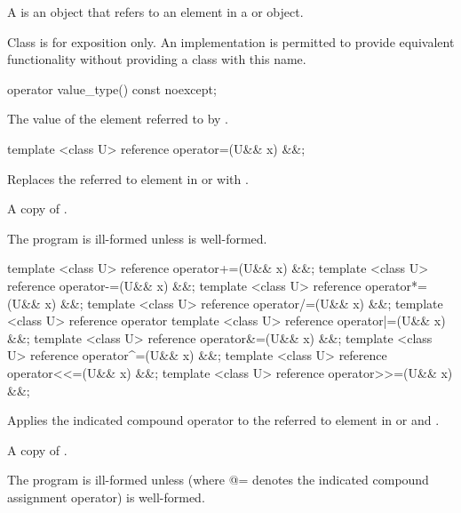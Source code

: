 \label{sec:reference type}
\pnum A  is an object that refers to an element in a \simd or \mask object.

\pnum Class  is for exposition only.
An implementation is permitted to provide equivalent functionality without providing a class with this name.



\begin{itemdecl}
operator value_type() const noexcept;
\end{itemdecl}
\begin{itemdescr}
  \pnum\returns The value of the element referred to by .
\end{itemdescr}

\begin{itemdecl}
template <class U> reference operator=(U&& x) &&;
\end{itemdecl}
\begin{itemdescr}
  \pnum\effects Replaces the referred to element in \simd or \mask with .

  \pnum\returns A copy of .

  \pnum\remarks The program is ill-formed unless  is well-formed.
\end{itemdescr}

\begin{itemdecl}
template <class U> reference operator+=(U&& x) &&;
template <class U> reference operator-=(U&& x) &&;
template <class U> reference operator*=(U&& x) &&;
template <class U> reference operator/=(U&& x) &&;
template <class U> reference operator%
template <class U> reference operator|=(U&& x) &&;
template <class U> reference operator&=(U&& x) &&;
template <class U> reference operator^=(U&& x) &&;
template <class U> reference operator<<=(U&& x) &&;
template <class U> reference operator>>=(U&& x) &&;
\end{itemdecl}
\begin{itemdescr}
  \pnum\effects Applies the indicated compound operator to the referred to element in \simd or \mask and .

  \pnum\returns A copy of .

  \pnum\remarks The program is ill-formed unless  (where \code @= denotes the indicated compound assignment operator) is well-formed.
\end{itemdescr}

